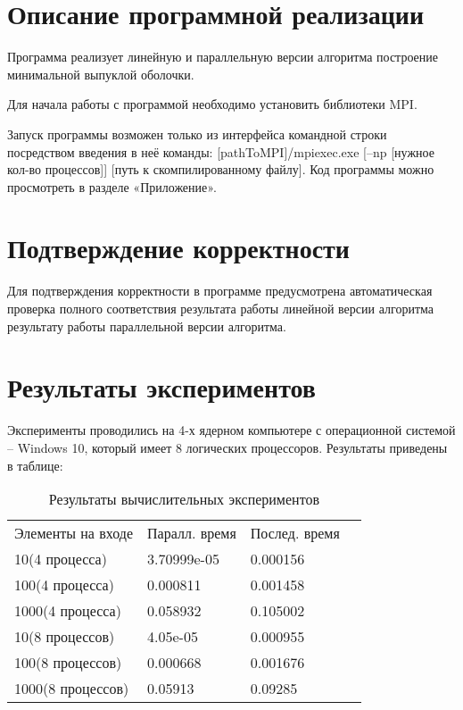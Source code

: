 \documentclass{report}
\begin{document}
\section*{Описание программной реализации}
\par 
Программа реализует линейную и параллельную версии алгоритма построение минимальной выпуклой оболочки.
\par 
Для начала работы с программой необходимо установить библиотеки MPI.
\par 
Запуск программы возможен только из интерфейса командной строки посредством введения в неё команды: [pathToMPI]/mpiexec.exe [–np [нужное кол-во процессов]] [путь к скомпилированному файлу].
Код программы можно просмотреть в разделе «Приложение».
\newpage

\section*{Подтверждение корректности}
Для подтверждения корректности в программе предусмотрена автоматическая проверка полного соответствия результата работы линейной версии алгоритма результату работы параллельной версии алгоритма.
\newpage

\section*{Результаты экспериментов}
Эксперименты проводились на 4-х ядерном компьютере с операционной системой – Windows 10, который имеет 8 логических процессоров. Результаты приведены в таблице:

\begin{table}[!h]
\caption{Результаты вычислительных экспериментов}
\centering
\begin{tabular}{llll}
Элементы на входе & Паралл. время & Послед. время \\
10(4 процесса) & 3.70999e-05 & 0.000156\\
100(4 процесса) & 0.000811 & 0.001458\\
1000(4 процесса) & 0.058932 & 0.105002\\
10(8 процессов) & 4.05e-05 & 0.000955\\
100(8 процессов) & 0.000668 & 0.001676\\
1000(8 процессов) & 0.05913	 & 0.09285\\
\end{tabular}
\end{table}
\par
\end{document}
